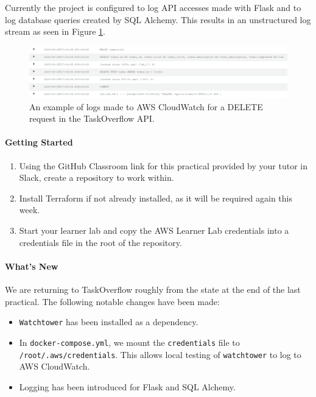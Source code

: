 \documentclass{csse4400}
\begin{document}
Currently the project is configured to log API accesses made with Flask and to log database queries created by SQL Alchemy.
This results in an unstructured log stream as seen in Figure \ref{fig:cloud-logs}.

\begin{figure}[ht]
    \includegraphics[width=\textwidth]{images/cloud-watch-log}
    \caption{An example of logs made to AWS CloudWatch for a DELETE request in the TaskOverflow API.}
    \label{fig:cloud-logs}
\end{figure}

\paragraph{Getting Started}
\begin{enumerate}
    \item Using the GitHub Classroom link for this practical provided by your tutor in Slack, create a repository to work within.
    \item Install Terraform if not already installed, as it will be required again this week.
    \item Start your learner lab and copy the AWS Learner Lab credentials into a credentials file in the root of the repository.
\end{enumerate}

\paragraph{What's New}
We are returning to TaskOverflow roughly from the state at the end of the last practical.
The following notable changes have been made:
\begin{itemize}
    \item \texttt{Watchtower} has been installed as a dependency.
    \item In \texttt{docker-compose.yml}, we mount the \texttt{credentials} file to \texttt{/root/.aws/credentials}.
        This allows local testing of \texttt{watchtower} to log to AWS CloudWatch.
    \item Logging has been introduced for Flask and SQL Alchemy.
\end{itemize}
\end{document}
